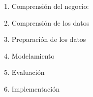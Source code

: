 \documentclass[letterpaper,12pt,oneside]{book} %
\begin{document}
\begin{enumerate}
    \item Comprensión del negocio:
    \item Comprensión de los datos
    \item Preparación de los datos
    \item Modelamiento
    \item Evaluación
    \item Implementación
\end{enumerate}
\end{document}
